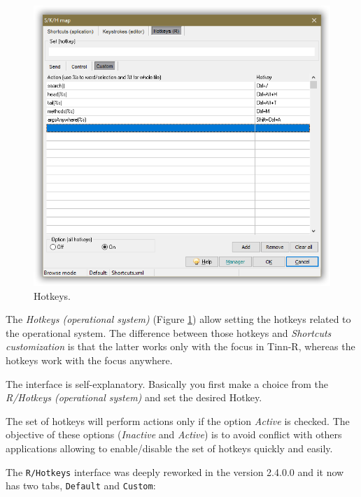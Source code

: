 \begin{figure}[H]
  \includegraphics[scale=0.36]{./res/hotkeys_custom.png}
  \caption{Hotkeys.}
  \label{fig:hotkeys}
\end{figure}

The \textit{Hotkeys (operational system)}
(Figure \ref{fig:hotkeys})
allow setting the hotkeys
related to the operational system. The difference between those hotkeys and
\textit{Shortcuts customization} is that the latter works only with the
focus in Tinn-R, whereas the hotkeys work with the focus anywhere.

The interface is self-explanatory. Basically you first make a choice from
the \textit{R/Hotkeys (operational system)} and set the desired Hotkey.

The set of hotkeys will perform actions only if the option \textit{Active}
is checked. The objective of these options (\textit{Inactive} and
\textit{Active}) is to avoid conflict with others applications allowing
to enable/disable the set of hotkeys quickly and easily.

The \texttt{R/Hotkeys} interface was deeply reworked in the version 2.4.0.0 and it now has two tabs,
\texttt{Default} and \texttt{Custom}:

